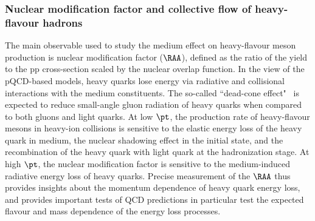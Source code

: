 

\subsubsection{Nuclear modification factor and collective flow of heavy-flavour hadrons}
\label{sec:HFRAAv2}
The main observable used to study the medium effect on heavy-flavour meson production is nuclear modification factor ($\RAA$), defined as the ratio of the \PbPb yield to the pp cross-section scaled by the nuclear overlap function. In the view of the pQCD-based models, heavy quarks lose energy via radiative and collisional interactions with the medium constituents. The so-called ``dead-cone effect"~\cite{DOKSHITZER2001199} is expected to reduce small-angle gluon radiation of heavy quarks when compared to both gluons and light quarks. At low $\pt$, the production rate of heavy-flavour mesons in heavy-ion collisions is sensitive to the elastic energy loss of the heavy quark in medium, the nuclear shadowing effect in the initial state, and the recombination of the heavy quark with light quark at the hadronization stage. At high $\pt$, the nuclear modification factor is sensitive to the medium-induced radiative energy loss of heavy quarks. Precise measurement of the $\RAA$ thus provides insights about the momentum dependence of heavy quark energy loss, and provides important tests of QCD predictions in particular test the expected flavour and mass dependence of the energy loss processes.

